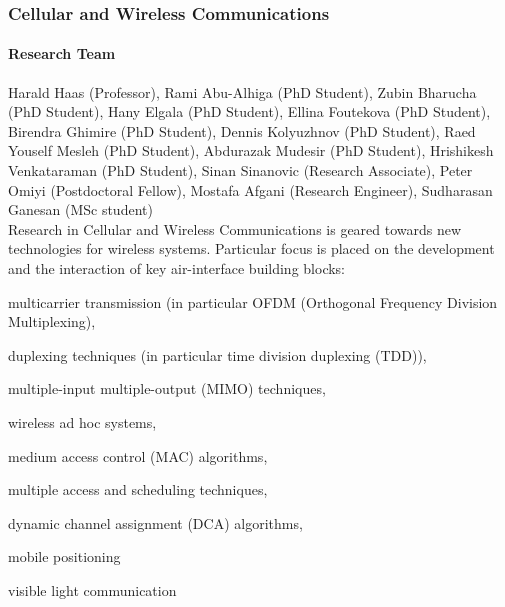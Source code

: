 
\subsubsection{Cellular and Wireless Communications}
\label{Haas1} 

\paragraph{Research Team}
Harald Haas (Professor), Rami Abu-Alhiga (PhD Student), Zubin Bharucha
(PhD Student), Hany Elgala (PhD Student), Ellina Foutekova (PhD
Student), Birendra Ghimire (PhD Student), Dennis Kolyuzhnov (PhD
Student),  Raed Youself Mesleh (PhD Student), Abdurazak Mudesir (PhD
Student), Hrishikesh Venkataraman (PhD Student), Sinan Sinanovic
(Research Associate), Peter Omiyi (Postdoctoral Fellow), Mostafa
Afgani (Research Engineer), Sudharasan Ganesan (MSc student)\\

Research in Cellular and Wireless Communications is geared towards new
technologies for wireless systems. Particular focus is placed on the
development and the interaction of key air-interface building blocks:
\begin{myitemize}
\item multicarrier transmission (in particular OFDM (Orthogonal Frequency Division Multiplexing),
\item duplexing techniques (in particular time division duplexing (TDD)),
\item multiple-input multiple-output (MIMO) techniques,
\item wireless ad hoc systems,
\item medium access control (MAC) algorithms,
\item multiple access and scheduling techniques,
\item dynamic channel assignment (DCA) algorithms,
\item mobile positioning
\item visible light communication
\end{myitemize}

